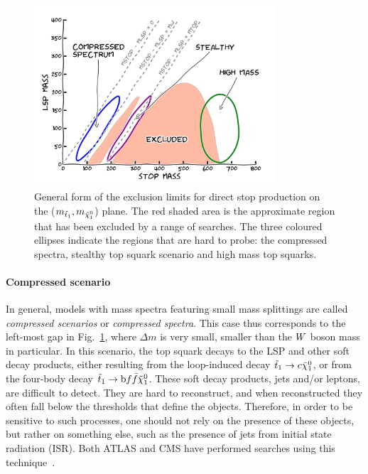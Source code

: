 \begin{figure}[htpb]
  \centering
  \includegraphics[width=0.8\textwidth]{figures/razor_motivation/story_boost_motivation}
  \caption{General form of the exclusion limits for direct stop production on the
($m_{\tilde{t}_1},m_{\tilde{\chi}_1^0}$) plane. The red shaded area is the approximate region that has been
excluded by a range of searches. The three coloured ellipses indicate the regions that are hard to
probe: the compressed spectra, stealthy top squark scenario and high mass top squarks.
  \label{fig:boost_story_motivation}}
\end{figure}

\paragraph{Compressed scenario}
In general, models with mass spectra featuring small mass splittings are called \textit{compressed
scenarios} or \textit{compressed spectra}. This case thus corresponds to the left-most gap in
Fig.~\ref{fig:boost_story_motivation}, where $\Delta m$ is very small, smaller than the $W$ boson
mass in particular. 
In this scenario, the top squark decays to the LSP and other soft decay products, either resulting
from the loop-induced decay $\tilde{t}_1 \rightarrow c \tilde{\chi}_1^0$, or from the four-body decay $\tilde{t}_1
\rightarrow \mathrm{b} f \bar{f} \tilde{\chi}_1^0$. These soft decay products, jets and/or leptons, are difficult to
detect. They are hard to reconstruct, and when reconstructed they often fall below the \pt
thresholds that define the objects. 
Therefore, in order to be sensitive to such processes, one should not rely on the presence of
these objects, but rather on something else, such as the presence of jets from initial state
radiation (ISR). Both ATLAS and CMS have performed searches using this
technique~\cite{CMS-PAS-SUS-13-009,Aad:2014nra}. 

